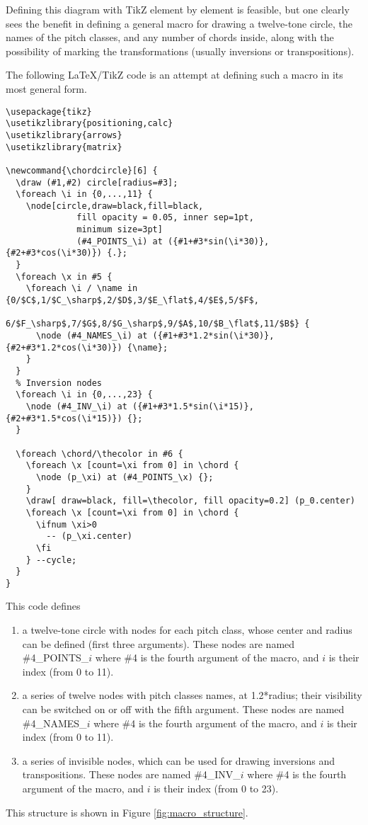 \documentclass[10pt]{article}
\newcommand{\chordcircle}[6] {
  \draw (#1,#2) circle[radius=#3]; 
  \foreach \i in {0,...,11} {
    \node[circle,draw=black,fill=black,
              fill opacity = 0.05, inner sep=1pt,
              minimum size=3pt] 
              (#4_POINTS_\i) at ({#1+#3*sin(\i*30)},{#2+#3*cos(\i*30)}) {.};
  }
  \foreach \x in #5 {
    \foreach \i / \name in {0/$C$,1/$C_\sharp$,2/$D$,3/$E_\flat$,4/$E$,5/$F$,
                 6/$F_\sharp$,7/$G$,8/$G_\sharp$,9/$A$,10/$B_\flat$,11/$B$} {
      \node (#4_NAMES_\i) at ({#1+#3*1.2*sin(\i*30)},{#2+#3*1.2*cos(\i*30)}) {\name};
    }
  }
  \foreach \i in {0,...,23} {
    \node (#4_INV_\i) at ({#1+#3*1.5*sin(\i*15)},{#2+#3*1.5*cos(\i*15)}) {};
  }
	
  \foreach \chord/\thecolor in #6 {	
    \foreach \x [count=\xi from 0] in \chord {
      \node (p_\xi) at (#4_POINTS_\x) {};
    }
    \draw[ draw=black, fill=\thecolor, fill opacity=0.2] (p_0.center)
    \foreach \x [count=\xi from 0] in \chord {
      \ifnum \xi>0
        -- (p_\xi.center)
      \fi
    } --cycle;
  }
}
\begin{document}
Defining this diagram with TikZ element by element is feasible, but one clearly sees the benefit in defining a general macro for drawing a twelve-tone circle, the names of the pitch classes, and any number of chords inside, along with the possibility of marking the transformations (usually inversions or transpositions).


\newpage

The following LaTeX/TikZ code is an attempt at defining such a macro in its most general form.

\begin{verbatim}
\usepackage{tikz}
\usetikzlibrary{positioning,calc}
\usetikzlibrary{arrows}
\usetikzlibrary{matrix}

\newcommand{\chordcircle}[6] {
  \draw (#1,#2) circle[radius=#3]; 
  \foreach \i in {0,...,11} {
    \node[circle,draw=black,fill=black,
              fill opacity = 0.05, inner sep=1pt,
              minimum size=3pt] 
              (#4_POINTS_\i) at ({#1+#3*sin(\i*30)},{#2+#3*cos(\i*30)}) {.};
  }
  \foreach \x in #5 {
    \foreach \i / \name in {0/$C$,1/$C_\sharp$,2/$D$,3/$E_\flat$,4/$E$,5/$F$,
                 6/$F_\sharp$,7/$G$,8/$G_\sharp$,9/$A$,10/$B_\flat$,11/$B$} {
      \node (#4_NAMES_\i) at ({#1+#3*1.2*sin(\i*30)},{#2+#3*1.2*cos(\i*30)}) {\name};
    }
  }
  % Inversion nodes
  \foreach \i in {0,...,23} {
    \node (#4_INV_\i) at ({#1+#3*1.5*sin(\i*15)},{#2+#3*1.5*cos(\i*15)}) {};
  }
	
  \foreach \chord/\thecolor in #6 {	
    \foreach \x [count=\xi from 0] in \chord {
      \node (p_\xi) at (#4_POINTS_\x) {};
    }
    \draw[ draw=black, fill=\thecolor, fill opacity=0.2] (p_0.center)
    \foreach \x [count=\xi from 0] in \chord {
      \ifnum \xi>0
        -- (p_\xi.center)
      \fi
    } --cycle;
  }
}
\end{verbatim}

\newpage

This code defines 
\begin{enumerate}
\item{a twelve-tone circle with nodes for each pitch class, whose center and radius can be defined (first three arguments). These nodes are named
\#4\_POINTS\_$i$ where \#4 is the fourth argument of the macro, and $i$ is their index (from 0 to 11).}
\item{a series of twelve nodes with pitch classes names, at 1.2*radius; their visibility can be switched on or off with the fifth argument. These nodes are named
\#4\_NAMES\_$i$ where \#4 is the fourth argument of the macro, and $i$ is their index (from 0 to 11).}
\item{a series of invisible nodes, which can be used for drawing inversions and transpositions. These nodes are named
\#4\_INV\_$i$ where \#4 is the fourth argument of the macro, and $i$ is their index (from 0 to 23).}
\end{enumerate}
This structure is shown in Figure \ref{fig:macro_structure}.
\end{document}
